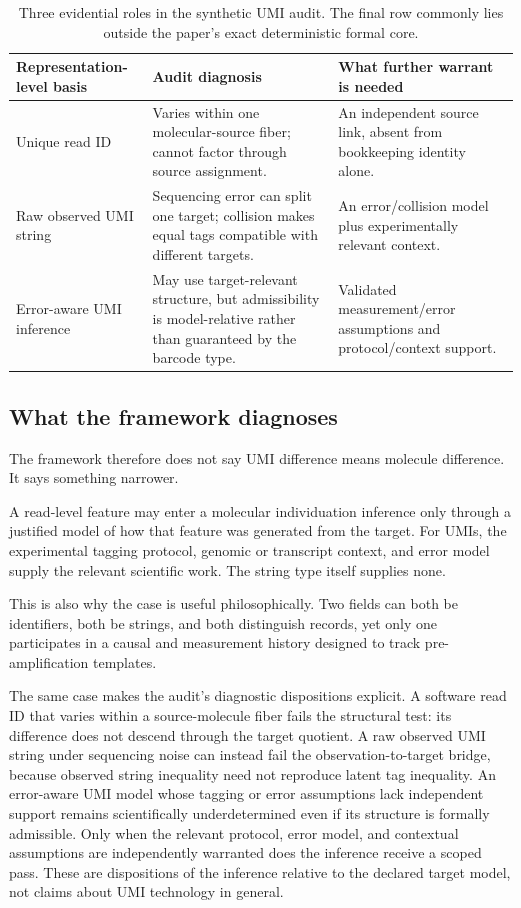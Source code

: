 \documentclass[11pt]{article}
\begin{document}
\begin{table}[ht]
\centering
\small
\begin{tabularx}{\textwidth}{@{}l >{\raggedright\arraybackslash}X >{\raggedright\arraybackslash}X@{}}
\toprule
\textbf{Representation-level basis} & \textbf{Audit diagnosis} & \textbf{What further warrant is needed} \\
\midrule
Unique read ID & Varies within one molecular-source fiber; cannot factor through source assignment. & An independent source link, absent from bookkeeping identity alone. \\
Raw observed UMI string & Sequencing error can split one target; collision makes equal tags compatible with different targets. & An error/collision model plus experimentally relevant context. \\
Error-aware UMI inference & May use target-relevant structure, but admissibility is model-relative rather than guaranteed by the barcode type. & Validated measurement/error assumptions and protocol/context support. \\
\bottomrule
\end{tabularx}
\caption{Three evidential roles in the synthetic UMI audit. The final row commonly lies outside the paper's exact deterministic formal core.}
\label{tab:umi-audit}
\end{table}

\subsection{What the framework diagnoses}

The framework therefore does not say UMI difference means molecule difference. It says something narrower.

A read-level feature may enter a molecular individuation inference only through a justified model of how that feature was generated from the target. For UMIs, the experimental tagging protocol, genomic or transcript context, and error model supply the relevant scientific work. The string type itself supplies none.

This is also why the case is useful philosophically. Two fields can both be identifiers, both be strings, and both distinguish records, yet only one participates in a causal and measurement history designed to track pre-amplification templates.

The same case makes the audit's diagnostic dispositions explicit. A software read ID that varies within a source-molecule fiber fails the structural test: its difference does not descend through the target quotient. A raw observed UMI string under sequencing noise can instead fail the observation-to-target bridge, because observed string inequality need not reproduce latent tag inequality. An error-aware UMI model whose tagging or error assumptions lack independent support remains scientifically underdetermined even if its structure is formally admissible. Only when the relevant protocol, error model, and contextual assumptions are independently warranted does the inference receive a scoped pass. These are dispositions of the inference relative to the declared target model, not claims about UMI technology in general.
\end{document}
